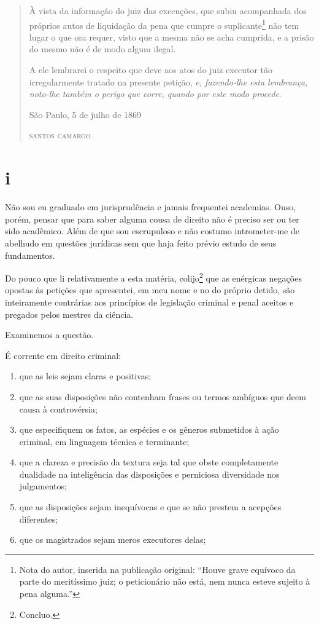 \begin{quote}
À vista da informação do juiz das execuções, que subiu acompanhada dos
próprios autos de liquidação da pena que cumpre o suplicante\footnote{Nota do autor, inserida na publicação original: ``Houve
  grave equívoco da parte do meritíssimo juiz; o peticionário não está,
  nem nunca esteve sujeito à pena alguma.''} não tem lugar o que ora
requer, visto que a mesma não se acha cumprida, e a prisão do mesmo não
é de modo algum ilegal.

A ele lembrarei o respeito que deve aos atos do juiz executor tão
irregularmente tratado na presente petição, \emph{e, fazendo-lhe esta
lembrança, noto-lhe também o perigo que corre, quando por este modo
procede}.

\begin{flushright}
São Paulo, 5 de julho de 1869

\textsc{santos camargo}
\end{flushright}
\end{quote}

\section{i}

Não sou eu graduado em jurisprudência e jamais frequentei academias.
Ouso, porém, pensar que para saber alguma cousa de direito não é preciso
ser ou ter sido acadêmico. Além de que sou escrupuloso e não costumo
intrometer-me de abelhudo em questões jurídicas sem que haja feito
prévio estudo de seus fundamentos.

Do pouco que li relativamente a esta matéria, colijo\footnote{Concluo.}
que as enérgicas negações opostas às petições que apresentei, em meu
nome e no do próprio detido, são inteiramente contrárias aos princípios
de legislação criminal e penal aceitos e pregados pelos mestres da
ciência.

Examinemos a questão.

É corrente em direito criminal:

\begin{enumerate}[label=\arabic*º:]
\item que as leis sejam claras e positivas;

\item que as suas disposições não contenham frases ou termos ambíguos que
deem causa à controvérsia;

\item que especifiquem os fatos, as espécies e os gêneros submetidos à
ação criminal, em linguagem técnica e terminante;

\item que a clareza e precisão da textura seja tal que obste completamente
dualidade na inteligência das disposições e perniciosa diversidade nos
julgamentos;

\item que as disposições sejam inequívocas e que se não prestem a acepções
diferentes;

\item que os magistrados sejam meros executores delas;
\end{enumerate}

